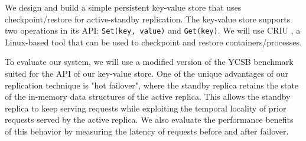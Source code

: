 \documentclass{proc}
\begin{document}
We design and build a simple persistent key-value store that uses
checkpoint/restore for active-standby replication. The key-value store supports
two operations in its API: \texttt{Set(key, value)} and \texttt{Get(key)}. We
will use CRIU \cite{CRIU}, a Linux-based tool that can be used to checkpoint and
restore containers/processes.

To evaluate our system, we will use a modified version of the YCSB benchmark
\cite{YCSB} suited for the API of our key-value store. One of the unique
advantages of our replication technique is "hot failover", where the standby
replica retains the state of the in-memory data structures of the active
replica. This allows the standby replica to keep serving requests while
exploiting the temporal locality of prior requests served by the active replica.
We also evaluate the performance benefits of this behavior by measuring the
latency of requests before and after failover.

\printbibliography
\end{document}
